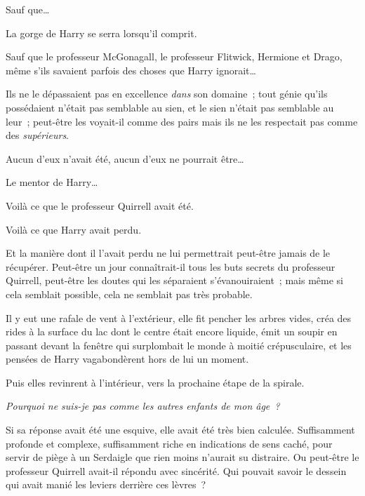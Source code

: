 Sauf que…

La gorge de Harry se serra lorsqu'il comprit.

Sauf que le professeur McGonagall, le professeur Flitwick, Hermione et Drago, même s'ils savaient parfois des choses que Harry ignorait…

Ils ne le dépassaient pas en excellence \emph{dans} son domaine~; tout génie qu'ils possédaient n'était pas semblable au sien, et le sien n'était pas semblable au leur~; peut-être les voyait-il comme des pairs mais ils ne les respectait pas comme des \emph{supérieurs}.

Aucun d'eux n'avait été, aucun d'eux ne pourrait être…

Le mentor de Harry…

Voilà ce que le professeur Quirrell avait été.

Voilà ce que Harry avait perdu.

Et la manière dont il l'avait perdu ne lui permettrait peut-être jamais de le récupérer. Peut-être un jour connaîtrait-il tous les buts secrets du professeur Quirrell, peut-être les doutes qui les séparaient s'évanouiraient~; mais même si cela semblait possible, cela ne semblait pas très probable.

Il y eut une rafale de vent à l'extérieur, elle fit pencher les arbres vides, créa des rides à la surface du lac dont le centre était encore liquide, émit un soupir en passant devant la fenêtre qui surplombait le monde à moitié crépusculaire, et les pensées de Harry vagabondèrent hors de lui un moment.

Puis elles revinrent à l'intérieur, vers la prochaine étape de la spirale.

\emph{Pourquoi ne suis-je pas comme les autres enfants de mon âge~?}

Si sa réponse avait été une esquive, elle avait été très bien calculée. Suffisamment profonde et complexe, suffisamment riche en indications de sens caché, pour servir de piège à un Serdaigle que rien moins n'aurait su distraire. Ou peut-être le professeur Quirrell avait-il répondu avec sincérité. Qui pouvait savoir le dessein qui avait manié les leviers derrière ces lèvres~?

